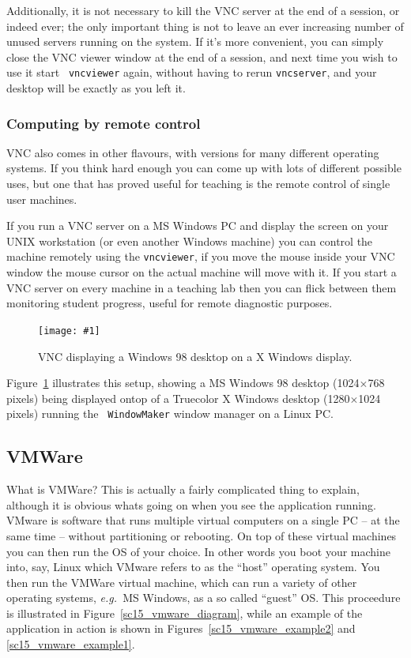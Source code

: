 \documentclass[twoside,11pt]{article}
\newcommand{\htmladdnormallink}[2]{#1}
\newcommand{\htmladdimg}[1]{}
\newcommand{\xlabel}[1]{}
\newcommand{\myfig}[5]{
  \begin{figure}
    \centering\texttt{[image: \#1]}
    \typeout{#1 inserted on page \arabic{page}}
    \caption{\label{#4}#5}
  \end{figure}
  }
\newcommand{\myfig}[5]{
    \label{#4} \htmladdimg{#3}\\
    Figure: #5\\
  }
\begin{document}
Additionally, it is not necessary to kill the VNC server at the end of
a session, or indeed ever; the only important thing is not to leave an
ever increasing number of unused servers running on the system. If
it's more convenient, you can simply close the VNC viewer window at
the end of a session, and next time you wish to use it start {\tt
vncviewer} again, without having to rerun {\tt vncserver}, and your
desktop will be exactly as you left it. 

\subsubsection{Computing by remote control}

\htmladdnormallink{VNC}{http://www.uk.research.att.com/vnc/} also
comes in other flavours, with versions for many different operating
systems. If you think hard enough you can come up with lots of
different possible uses, but one that has proved useful for teaching
is the remote control of single user machines. 

If you run a VNC server on a MS Windows PC and display the screen on
your UNIX workstation (or even another Windows machine) you can
control the machine remotely using the {\tt vncviewer}, if you move
the mouse inside your VNC window the mouse cursor on the actual
machine will move with it. If you start a VNC server on every machine
in a teaching lab then you can flick between them monitoring student
progress, useful for remote diagnostic purposes.

\myfig{sc15_vncwin.eps}{height=0.45\textheight}{sc15_vncwin.gif}{sc15_vnc_win}{VNC
displaying a Windows 98 desktop on a X Windows display.}

Figure~\ref{sc15_vnc_win} illustrates this setup, showing a MS Windows
98 desktop (1024$\times$768 pixels) being displayed ontop of a
Truecolor X Windows desktop (1280$\times$1024 pixels) running the {\tt
WindowMaker} window manager on a Linux PC.

\subsection{\xlabel{sc15_vmware}VMWare\label{sc15_vmware}}

What is \htmladdnormallink{VMWare}{http://www.vmware.com/}? This is
actually a fairly complicated thing to explain, although it is obvious
whats going on when you see the application running. VMware is
software that runs multiple virtual computers on a single PC -- at the
same time -- without partitioning or rebooting. On top of these
virtual machines you can then run the OS of your choice. In other
words you boot your machine into, say, Linux which VMware refers to as
the ``host'' operating system. You then run the VMWare virtual
machine, which can run a variety of other operating systems, {\em
e.g.\ }MS Windows, as a so called ``guest'' OS. This proceedure is
illustrated in Figure~\ref{sc15_vmware_diagram}, while an example of
the application in action is shown in
Figures~\ref{sc15_vmware_example2} and \ref{sc15_vmware_example1}.
\end{document}
